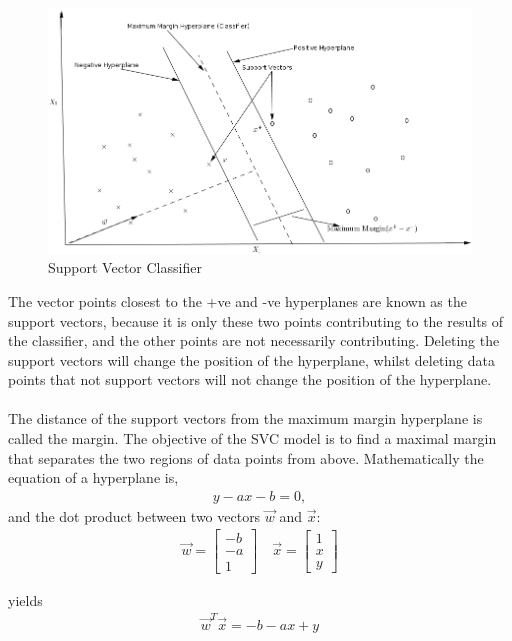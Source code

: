 \documentclass[12pt,a4paper]{article}
\begin{document}
\begin{figure}[h!]
\label{fig:svm}
\centering
\includegraphics[scale=0.55]{svm_1}
\caption{Support Vector Classifier}
\centering
\end{figure}

\noindent  The vector points closest to the +ve and -ve hyperplanes are known as the support vectors, because it is only these two points contributing to the results of the classifier, and the other points are not necessarily contributing. Deleting the support vectors  will change the position of the hyperplane, whilst deleting data points that not support vectors will not change the position of the hyperplane. \\
\\
The distance of the support vectors from the maximum margin hyperplane is called the margin. The objective of the SVC model is to find a maximal margin that separates the two regions of data points from above. Mathematically the equation of a hyperplane is,
\begin{align}
y-ax-b=0,
\end{align}
and the dot product between two vectors $\vec{w}$ and $\vec{x}$:
\begin{align}
\vec{w} =\begin{bmatrix}
-b\\-a\\1
\end{bmatrix}\quad \vec{x}=\begin{bmatrix}
1\\x\\y
\end{bmatrix}
\end{align}

\noindent yields 
\begin{align}
\vec{w}^T\vec{x}=-b-ax+y
\end{align}
\end{document}

